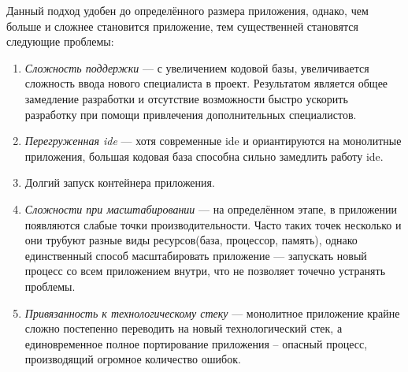 Данный подход удобен до определённого размера приложения, однако, чем больше и сложнее становится приложение, тем существенней становятся следующие проблемы:

\begin{enumerate}
	\item \emph{Сложность поддержки} --- с увеличением кодовой базы, увеличивается сложность ввода нового специалиста в проект. Результатом является общее замедление разработки и отсутствие возможности быстро ускорить разработку при помощи привлечения дополнительных специалистов.
	\item \emph{Перегруженная \gls{ide}} --- хотя современные \gls{ide} и ориантируются на монолитные приложения, большая кодовая база способна сильно замедлить работу \gls{ide}.
	\item Долгий запуск контейнера приложения.
	\item \emph{Сложности при масштабировании} --- на определённом этапе, в приложении появляются слабые точки производительности. Часто таких точек несколько и они трубуют разные виды ресурсов(база, процессор, память), однако единственный способ масштабировать приложение --- запускать новый процесс со всем приложением внутри, что не позволяет точечно устранять проблемы.
	\item \emph{Привязанность к технологическому стеку} --- монолитное приложение крайне сложно постепенно переводить на новый технологический стек, а единовременное полное портирование приложения -- опасный процесс, производящий огромное количество ошибок.
\end{enumerate}
